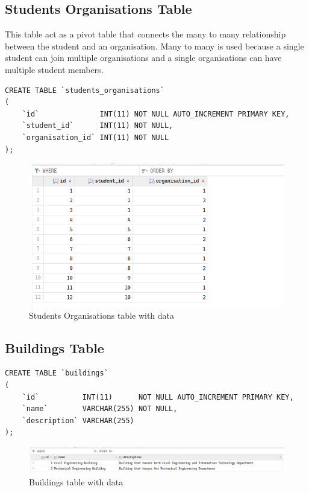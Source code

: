 \documentclass[12pt,titlepage]{article}
\begin{document}
\subsection{Students Organisations Table}
This table act as a pivot table that connects the many to many relationship between the student and an organisation.
Many to many is used because a single student can join multiple organisations and a single organisations can have multiple student members.

\begin{verbatim}
CREATE TABLE `students_organisations`
(
    `id`              INT(11) NOT NULL AUTO_INCREMENT PRIMARY KEY,
    `student_id`      INT(11) NOT NULL,
    `organisation_id` INT(11) NOT NULL
);
\end{verbatim}

\begin{figure}[h]
    \centering
    \includegraphics[width=\textwidth]{./images/students-organisations-table.png}
    \caption{Students Organisations table with data}
\end{figure}

\subsection{Buildings Table}
\begin{verbatim}
CREATE TABLE `buildings`
(
    `id`          INT(11)      NOT NULL AUTO_INCREMENT PRIMARY KEY,
    `name`        VARCHAR(255) NOT NULL,
    `description` VARCHAR(255)
);
\end{verbatim}

\begin{figure}[h]
    \centering
    \includegraphics[width=\textwidth]{./images/buildings-table.png}
    \caption{Buildings table with data}
\end{figure}
\end{document}
